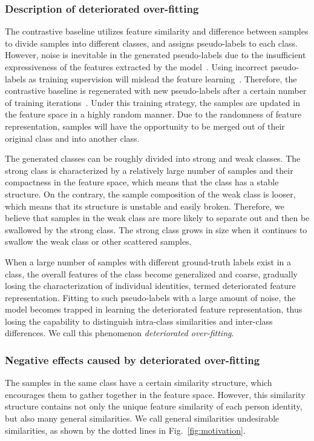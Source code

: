 \documentclass[lettersize,journal]{IEEEtran}
\begin{document}
\subsubsection{Description of deteriorated over-fitting}
The contrastive baseline utilizes feature similarity and difference between samples to divide samples into different classes, and assigns pseudo-labels to each class. 
However, noise is inevitable in the generated pseudo-labels due to the insufficient expressiveness of the features extracted by the model~\cite{MMT,SpCL,HCT,Ad-cluster}.
Using incorrect pseudo-labels as training supervision will mislead the feature learning~\cite{lablenoise1,lablenoise2}. Therefore, the contrastive baseline is regenerated with new pseudo-labels after a certain number of training iterations~\cite{SpCL}. Under this training strategy, the samples are updated in the feature space in a highly random manner.
Due to the randomness of feature representation, samples will have the opportunity to be merged out of their original class and into another class.

The generated classes can be roughly divided into strong and weak classes.
The strong class is characterized by a relatively large number of samples and their compactness in the feature space, which means that the class has a stable structure.
On the contrary, the sample composition of the weak class is looser, which means that its structure is unstable and easily broken.
Therefore, we believe that samples in the weak class are more likely to separate out and then be swallowed by the strong class. The strong class grows in size when it continues to swallow the weak class or other scattered samples.

When a large number of samples with different ground-truth labels exist in a class, the overall features of the class become generalized and coarse, gradually losing the characterization of individual identities, termed deteriorated feature representation. Fitting to such pseudo-labels with a large amount of noise, the model becomes trapped in learning the deteriorated feature representation, thus losing the capability to distinguish intra-class similarities and inter-class differences. We call this phenomenon \emph{deteriorated over-fitting}.

\subsubsection{Negative effects caused by deteriorated over-fitting}
The samples in the same class have a certain similarity structure, which encourages them to gather together in the feature space. However, this similarity structure contains not only the unique feature similarity of each person identity, but also many general similarities. We call general similarities undesirable similarities, as shown by the dotted lines in Fig.~\ref{fig:motivation}.
\end{document}
